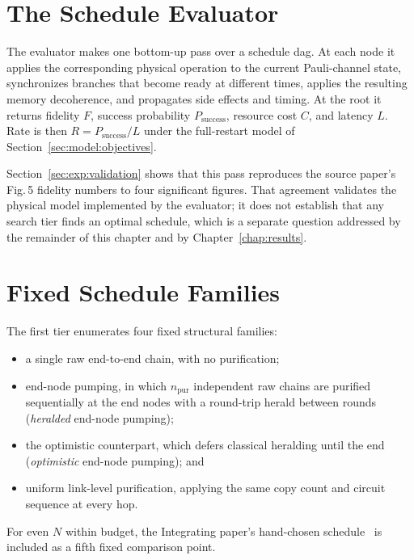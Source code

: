 \section{The Schedule Evaluator}
\label{sec:alg:evaluator}


The evaluator makes one bottom-up pass over a schedule \Gls{dag}. At each node it applies the corresponding physical operation to the current Pauli-channel state, synchronizes branches that become ready at different times, applies the resulting memory decoherence, and propagates side effects and timing. At the root it returns fidelity $F$, success probability $P_{\mathrm{success}}$, resource cost $C$, and latency $L$. Rate is then $R=P_{\mathrm{success}}/L$ under the full-restart model of Section~\ref{sec:model:objectives}.

Section~\ref{sec:exp:validation} shows that this pass reproduces the source paper's Fig.\,5 fidelity numbers to four significant figures. That agreement validates the physical model implemented by the evaluator; it does not establish that any search tier finds an optimal schedule, which is a separate question addressed by the remainder of this chapter and by Chapter~\ref{chap:results}.

\section{Fixed Schedule Families}
\label{sec:alg:bruteforce}

The first tier enumerates four fixed structural families:
\begin{itemize}
    \item a single raw end-to-end chain, with no purification;
    \item end-node pumping, in which $n_{\mathrm{pur}}$ independent raw chains are purified sequentially at the end nodes with a round-trip herald between rounds (\emph{heralded} end-node pumping);
    \item the optimistic counterpart, which defers classical heralding until the end (\emph{optimistic} end-node pumping); and
    \item uniform link-level purification, applying the same copy count and circuit sequence at every hop.
\end{itemize}
For even $N$ within budget, the Integrating paper's hand-chosen schedule~\cite{Benchasattabuse2025Integrating} is included as a fifth fixed comparison point.


